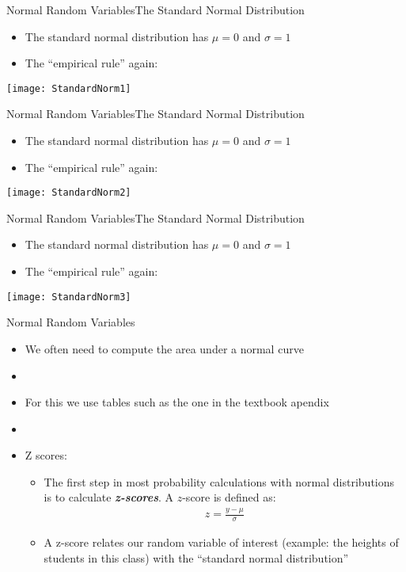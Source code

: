 \documentclass[xcolor=dvipsnames]{beamer}
\begin{document}
\begin{frame}{Normal Random Variables}{The Standard Normal Distribution}
	\begin{itemize}
		\item The standard normal distribution has $\mu = 0$ and $\sigma = 1$
		\item The ``empirical rule'' again:
	\end{itemize}
\begin{center}
	\texttt{[image: StandardNorm1]}
\end{center}
\end{frame}

\begin{frame}{Normal Random Variables}{The Standard Normal Distribution}
	\begin{itemize}
		\item The standard normal distribution has $\mu = 0$ and $\sigma = 1$
		\item The ``empirical rule'' again:
	\end{itemize}
	\begin{center}
		\texttt{[image: StandardNorm2]}
	\end{center}
\end{frame}

\begin{frame}{Normal Random Variables}{The Standard Normal Distribution}
	\begin{itemize}
		\item The standard normal distribution has $\mu = 0$ and $\sigma = 1$
		\item The ``empirical rule'' again:
	\end{itemize}
	\begin{center}
		\texttt{[image: StandardNorm3]}
	\end{center}
\end{frame}

\begin{frame}{Normal Random Variables}
	\begin{itemize}
		\item We often need to compute the area under a normal curve
		\item[]
		\item For this we use tables such as the one in the textbook apendix
		\item[]
		\item Z scores:
		\begin{itemize}
			\item The first step in most probability calculations with normal distributions is to calculate \textbf{\emph{z-scores}}. A $z$-score is defined as:
			\begin{gather*}
			z = \frac{y-\mu}{\sigma}
			\end{gather*}
			\item A z-score relates our random variable of interest (example: the heights of students in this class) with the ``standard normal distribution''
		\end{itemize}
	\end{itemize}
\end{frame}
\end{document}
